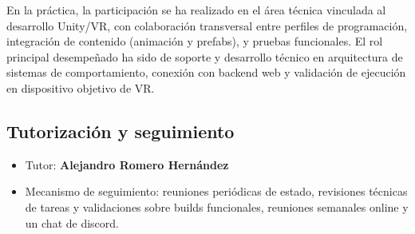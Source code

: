 En la práctica, la participación se ha realizado en el área técnica vinculada al desarrollo Unity/VR, con colaboración transversal entre perfiles de programación, integración de contenido (animación y prefabs), y pruebas funcionales. El rol principal desempeñado ha sido de soporte y desarrollo técnico en arquitectura de sistemas de comportamiento, conexión con backend web y validación de ejecución en dispositivo objetivo de VR.

\subsection{Tutorización y seguimiento}
\begin{itemize}[leftmargin=1.5em]
    \item Tutor: \textbf{Alejandro Romero Hernández}
    \item Mecanismo de seguimiento: reuniones periódicas de estado, revisiones técnicas de tareas y validaciones sobre builds funcionales, reuniones semanales online y un chat de discord.
\end{itemize}